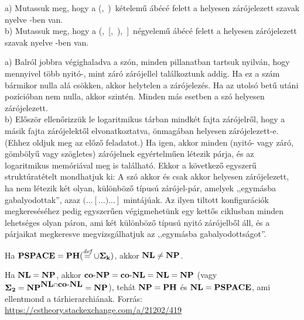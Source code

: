 \begin{Exercise}[counter={sorszam}, difficulty=0]
	a) Mutassuk meg, hogy a (,\ )\ kételem\H u ábécé felett a helyesen zárójelezett szavak nyelve \LOGSPACE-ben van.\\
	b) Mutassuk meg, hogy a (,\ [,\ ),\ ]\ négyelem\H u ábécé felett a helyesen zárójelezett szavak nyelve \LOGSPACE-ben van.\\
\end{Exercise}	
\begin{Answer}
	a) Balról jobbra végighaladva a szón, minden pillanatban tartsuk nyilván,
	hogy mennyivel több nyitó-, mint záró zárójellel találkoztunk addig.
	Ha ez a szám bármikor nulla alá csökken, akkor helytelen a zárójelezés.
	Ha az utolsó betű utáni pozícióban nem nulla, akkor szintén. Minden más
	esetben a szó helyesen zárójelezett.\\
	b) Először ellenőrizzük le logaritmikus tárban mindkét fajta zárójelről, hogy a másik fajta zárójelektől elvonatkoztatva, önmagában helyesen zárójelezett-e. (Ehhez oldjuk meg az előző feladatot.) Ha igen, akkor minden (nyitó- vagy záró, gömbölyű vagy szögletes) zárójelnek egyértelműen létezik párja, és az logaritmikus memóriával meg is található. Ekkor a következő egyszerű struktúratételt mondhatjuk ki: A szó akkor és csak akkor helyesen zárójelezett, ha nem létezik két olyan, különböző típusú zárójel-pár, amelyek ,,egymásba gabalyodottak'', azaz $(\dots[\dots)\dots]$ mintájúak. Az ilyen tiltott konfigurációk megkereséséhez pedig egyszerűen végigmehetünk egy kettős ciklusban minden lehetséges olyan páron, ami két különböző típusú nyitó zárójelből áll, és a párjaikat megkeresve megvizsgálhatjuk az ,,egymásba gabalyodottságot''. 
\end{Answer}

\begin{Exercise}[counter={sorszam}, difficulty=0]
	Ha $\mbox{\ensuremath{\mathbf{PSPACE}}}= \mbox{\ensuremath{\mathbf{PH}}}(\stackrel{\textit{def}}=\cup\mbox{\ensuremath{\mathbf{\Sigma_k}}})$, akkor $\mbox{\ensuremath{\mathbf{NL}}}\ne \mbox{\ensuremath{\mathbf{NP}}}$.
\end{Exercise}	
\begin{Answer}
	Ha $\mbox{\ensuremath{\mathbf{NL}}}=\mbox{\ensuremath{\mathbf{NP}}}$, akkor $\mbox{\ensuremath{\mathbf{co\text{-}NP}}}=\mbox{\ensuremath{\mathbf{co\text{-}NL}}}=\mbox{\ensuremath{\mathbf{NL}}}=\mbox{\ensuremath{\mathbf{NP}}}$ (vagy $\mbox{\ensuremath{\mathbf{\Sigma_2}}}=\mbox{\ensuremath{\mathbf{NP}}}^{\mbox{\ensuremath{\mathbf{NL}}}\cap \mbox{\ensuremath{\mathbf{co\text{-}NL}}}}=\mbox{\ensuremath{\mathbf{NP}}}$), teh\'at $\mbox{\ensuremath{\mathbf{NP}}}=\mbox{\ensuremath{\mathbf{PH}}}$ \'es $\mbox{\ensuremath{\mathbf{NL}}}=\mbox{\ensuremath{\mathbf{PSPACE}}}$, ami ellentmond a t\'arhierarchi\'anak.
	Forr\'as: \url{https://cstheory.stackexchange.com/a/21202/419}
\end{Answer} 


